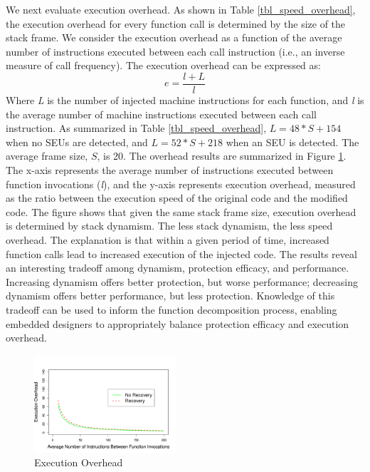 We next evaluate execution overhead. As shown in Table \ref{tbl_speed_overhead}, the execution overhead for every function call is determined by the size of the stack frame. We consider the execution overhead as a function of the average number of instructions executed between each call instruction (i.e., an inverse measure of call frequency). The execution overhead can be expressed as:
\begin{equation}\label{eq_seu1}
e=\frac{l+L}{l}
\end{equation}
Where \textit{L} is the number of injected machine instructions for each function, and \textit{l} is the average number of machine instructions executed between each call instruction. As summarized in Table \ref{tbl_speed_overhead}, $L=48*S+154$ when no SEUs are detected, and $L=52*S+218$ when an SEU is detected. The average frame size, $S$, is 20. The overhead results are summarized in Figure \ref{fig:speed_overhead}. The x-axis represents the average number of instructions executed between function invocations (\textit{l}), and the y-axis represents execution overhead, measured as the ratio between the execution speed of the original code and the modified code. The figure shows that given the same stack frame size, execution overhead is determined by stack dynamism. The less stack dynamism, the less speed overhead. The explanation is that within a given period of time, increased function calls lead to increased execution of the injected code. The results reveal an interesting tradeoff among dynamism, protection efficacy, and performance. Increasing dynamism offers better protection, but worse performance; decreasing dynamism offers better performance, but less protection. Knowledge of this tradeoff can be used to inform the function decomposition process, enabling embedded designers to appropriately balance protection efficacy and execution overhead.
\begin{figure}
\centering
\includegraphics[width=0.47\textwidth]{figures/speed_overhead_line_chart_v1.pdf}
\vspace{5pt}
\caption{Execution Overhead}
\label{fig:speed_overhead}
\end{figure}